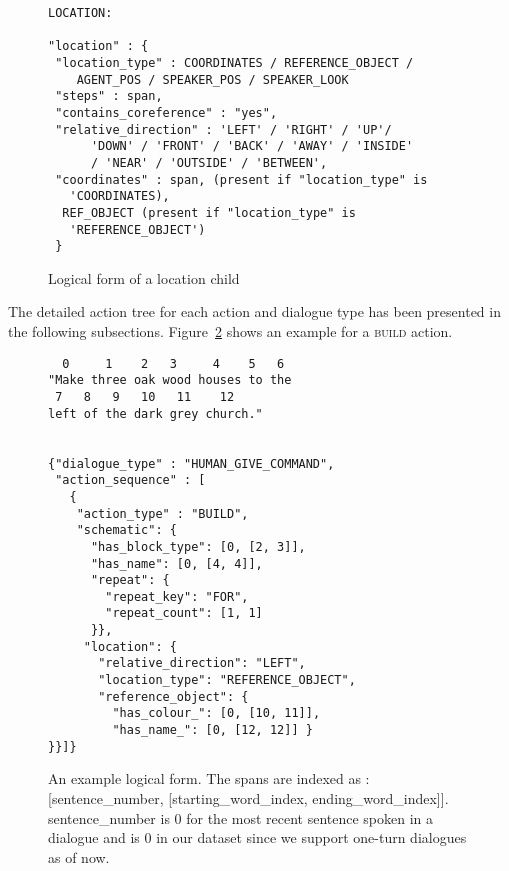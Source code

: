 \begin{figure}[ht]
    \centering
    \fontsize{7pt}{8pt}\selectfont
    \begin{verbatim}
LOCATION:

"location" : {
 "location_type" : COORDINATES / REFERENCE_OBJECT / 
    AGENT_POS / SPEAKER_POS / SPEAKER_LOOK
 "steps" : span,
 "contains_coreference" : "yes",
 "relative_direction" : 'LEFT' / 'RIGHT' / 'UP'/ 
      'DOWN' / 'FRONT' / 'BACK' / 'AWAY' / 'INSIDE'
      / 'NEAR' / 'OUTSIDE' / 'BETWEEN',
 "coordinates" : span, (present if "location_type" is
   'COORDINATES),
  REF_OBJECT (present if "location_type" is 
   'REFERENCE_OBJECT')
 }
    \end{verbatim}
    \vspace{-20pt}
    \caption{Logical form of a location child}
    \vspace{-8pt}
    \label{fig:location}
\end{figure}


The detailed action tree for each action and dialogue type has been presented in the following subsections. Figure~\ref{fig:action_tree_ex} shows an example for a \textsc{build} action.

\begin{figure}[ht]
    \centering
    \small
    \begin{verbatim}
  0     1    2   3     4    5   6
"Make three oak wood houses to the
 7   8   9   10   11    12
left of the dark grey church."


{"dialogue_type" : "HUMAN_GIVE_COMMAND",
 "action_sequence" : [
   {
    "action_type" : "BUILD",
    "schematic": {
      "has_block_type": [0, [2, 3]],
      "has_name": [0, [4, 4]],
      "repeat": {
        "repeat_key": "FOR",
        "repeat_count": [1, 1]
      }},
     "location": {
       "relative_direction": "LEFT",
       "location_type": "REFERENCE_OBJECT",
       "reference_object": {
         "has_colour_": [0, [10, 11]],
         "has_name_": [0, [12, 12]] }
}}]}
    \end{verbatim}
    \vspace{-20pt}
    \caption{An example logical form. The spans are indexed as : [sentence\_number, [starting\_word\_index, ending\_word\_index]].  sentence\_number is 0 for the most recent sentence spoken in a dialogue and is 0 in our dataset since we support one-turn dialogues as of now.}
    \vspace{-8pt}
    \label{fig:action_tree_ex}
\end{figure}



